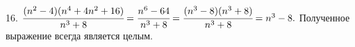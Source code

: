 16. $\cfrac{(n^2-4)(n^4+4n^2+16)}{n^3+8}=\cfrac{n^6-64}{n^3+8}=\cfrac{(n^3-8)(n^3+8)}{n^3+8}=n^3-8.$ Полученное выражение всегда является целым.\\
